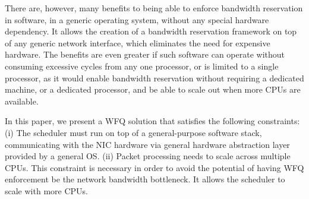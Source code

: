 There are, however, many benefits to being able to enforce bandwidth reservation
in software, in a generic operating system, without any special hardware
dependency.  It allows the creation of a bandwidth reservation framework on top
of any generic network interface, which eliminates the need for expensive
hardware.  The benefits are even greater if such software can operate without
consuming excessive cycles from any one processor, or is limited to a single
processor, as it would enable bandwidth reservation without requiring a
dedicated machine, or a dedicated processor, and be able to scale out when more
CPUs are available.

In this paper, we present a WFQ solution that satisfies the following
constraints: (i) The scheduler must run on top of a general-purpose software
stack, communicating with the NIC hardware via general hardware abstraction
layer provided by a general OS. (ii) Packet processing needs to scale across
multiple CPUs.  This constraint is necessary in order to avoid the potential of
having WFQ enforcement be the network bandwidth bottleneck.  It allows the
scheduler to scale with more CPUs.
